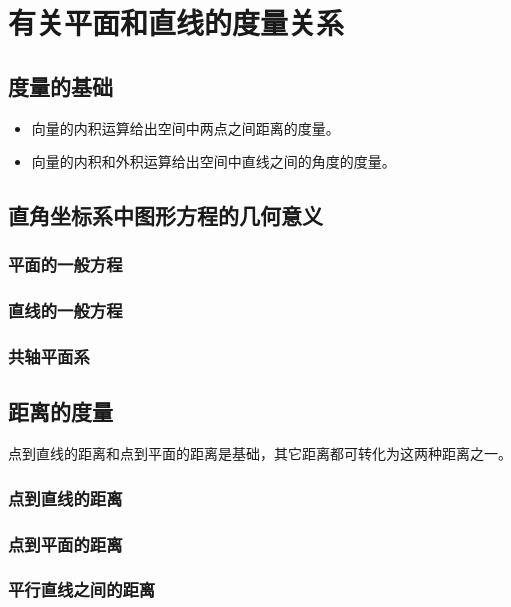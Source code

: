 \documentclass[onecolumn]{ctexart}
\begin{document}
\section{有关平面和直线的度量关系}

\subsection{度量的基础}
\begin{itemize}
  \item 向量的内积运算给出空间中两点之间距离的度量。
  \item 向量的内积和外积运算给出空间中直线之间的角度的度量。
\end{itemize}

\subsection{直角坐标系中图形方程的几何意义}

\subsubsection{平面的一般方程}

\subsubsection{直线的一般方程}

\subsubsection{共轴平面系}

\subsection{距离的度量}
点到直线的距离和点到平面的距离是基础，其它距离都可转化为这两种距离之一。

\subsubsection{点到直线的距离}

\subsubsection{点到平面的距离}

\subsubsection{平行直线之间的距离}
\end{document}
